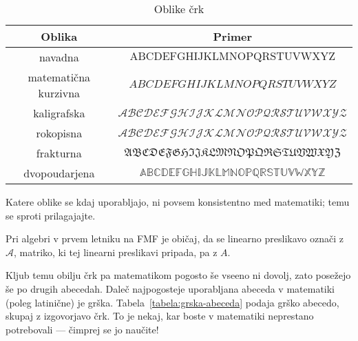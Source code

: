                \begin{table}[!ht]
                        \centering
                        \begin{tabular}{c|c}
                                \textbf{Oblika} & \textbf{Primer} \\
                                \hline
                                navadna & $\mathrm{ABCDEFGHIJKLMNOPQRSTUVWXYZ}$ \\
                                matematična kurzivna & $ABCDEFGHIJKLMNOPQRSTUVWXYZ$ \\
                                kaligrafska & $\mathcal{ABCDEFGHIJKLMNOPQRSTUVWXYZ}$ \\
                                rokopisna & $\mathscr{ABCDEFGHIJKLMNOPQRSTUVWXYZ}$ \\
                                frakturna & $\mathfrak{ABCDEFGHIJKLMNOPQRSTUVWXYZ}$ \\
                                dvopoudarjena & $\mathbb{ABCDEFGHIJKLMNOPQRSTUVWXYZ}$
                        \end{tabular}
                        \caption{Oblike črk}\label{tabela:oblike-crk}
                \end{table}



                Katere oblike se kdaj uporabljajo, ni povsem konsistentno med matematiki; temu se sproti prilagajajte.

                \begin{zgled}
                        Pri algebri v prvem letniku na FMF je običaj, da se linearno preslikavo označi z $\mathcal{A}$, matriko, ki tej linearni preslikavi pripada, pa z $A$.
                \end{zgled}

                Kljub temu obilju črk pa matematikom pogosto še vseeno ni dovolj, zato posežejo še po drugih abecedah. Daleč najpogosteje uporabljana abeceda v matematiki (poleg latinične) je grška. Tabela~\ref{tabela:grska-abeceda} podaja grško abecedo, skupaj z izgovorjavo črk. To je nekaj, kar boste v matematiki neprestano potrebovali --- čimprej se jo naučite!

